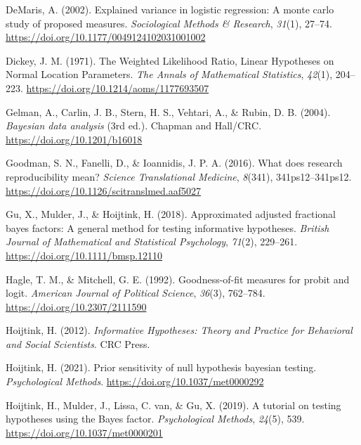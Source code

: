 \documentclass[
]{interact}
\newlength{\cslhangindent}
\newlength{\cslentryspacingunit} %
\newenvironment{CSLReferences}[2] %
    {%
  \setlength{\parindent}{0pt}
  \ifodd #1
  \let\oldpar\par
  \def\par{\hangindent=\cslhangindent\oldpar}
  \fi
  \setlength{\parskip}{#2\cslentryspacingunit}
 }%
 {}
\begin{document}
\begin{CSLReferences}{1}{0}
\leavevmode{}%
DeMaris, A. (2002). Explained variance in logistic regression: A monte
carlo study of proposed measures. \emph{Sociological Methods \&
Research}, \emph{31}(1), 27--74.
\url{https://doi.org/10.1177/0049124102031001002}

\leavevmode{}%
Dickey, J. M. (1971). {The Weighted Likelihood Ratio, Linear Hypotheses
on Normal Location Parameters}. \emph{The Annals of Mathematical
Statistics}, \emph{42}(1), 204--223.
\url{https://doi.org/10.1214/aoms/1177693507}

\leavevmode{}%
Gelman, A., Carlin, J. B., Stern, H. S., Vehtari, A., \& Rubin, D. B.
(2004). \emph{Bayesian data analysis} (3rd ed.). {Chapman and Hall/CRC}.
\url{https://doi.org/10.1201/b16018}

\leavevmode{}%
Goodman, S. N., Fanelli, D., \& Ioannidis, J. P. A. (2016). What does
research reproducibility mean? \emph{Science Translational Medicine},
\emph{8}(341), 341ps12--341ps12.
\url{https://doi.org/10.1126/scitranslmed.aaf5027}

\leavevmode{}%
Gu, X., Mulder, J., \& Hoijtink, H. (2018). Approximated adjusted
fractional bayes factors: A general method for testing informative
hypotheses. \emph{British Journal of Mathematical and Statistical
Psychology}, \emph{71}(2), 229--261.
\url{https://doi.org/10.1111/bmsp.12110}

\leavevmode{}%
Hagle, T. M., \& Mitchell, G. E. (1992). Goodness-of-fit measures for
probit and logit. \emph{American Journal of Political Science},
\emph{36}(3), 762--784. \url{https://doi.org/10.2307/2111590}

\leavevmode{}%
Hoijtink, H. (2012). \emph{Informative {H}ypotheses: {T}heory and
{P}ractice for {B}ehavioral and {S}ocial {S}cientists}. CRC Press.

\leavevmode{}%
Hoijtink, H. (2021). Prior sensitivity of null hypothesis bayesian
testing. \emph{Psychological Methods}.
\url{https://doi.org/10.1037/met0000292}

\leavevmode{}%
Hoijtink, H., Mulder, J., Lissa, C. van, \& Gu, X. (2019). A tutorial on
testing hypotheses using the {B}ayes factor. \emph{Psychological
Methods}, \emph{24}(5), 539. \url{https://doi.org/10.1037/met0000201}


\end{CSLReferences}
\end{document}

